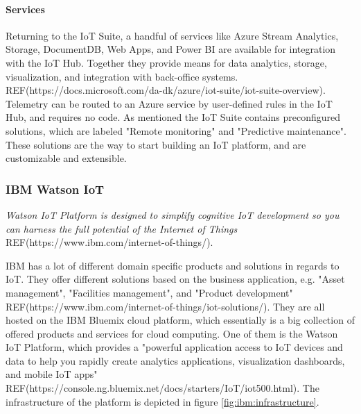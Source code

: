 \paragraph{Services}
Returning to the IoT Suite, a handful of services like Azure Stream Analytics, Storage, DocumentDB, Web Apps, and Power BI are available for integration with the IoT Hub. Together they provide means for data analytics, storage, visualization, and integration with back-office systems. REF(https://docs.microsoft.com/da-dk/azure/iot-suite/iot-suite-overview). Telemetry can be routed to an Azure service by user-defined rules in the IoT Hub, and requires no code. As mentioned the IoT Suite contains preconfigured solutions, which are labeled "Remote monitoring" and "Predictive maintenance". These solutions are the way to start building an IoT platform, and are customizable and extensible. 

\subsubsection{IBM Watson IoT}
\textit{Watson IoT Platform is designed to simplify cognitive IoT development so you can harness the full potential of the Internet of Things} REF(https://www.ibm.com/internet-of-things/).

IBM has a lot of different domain specific products and solutions in regards to IoT. They offer different solutions based on the business application, e.g. "Asset management", "Facilities management", and "Product development" REF(https://www.ibm.com/internet-of-things/iot-solutions/). They are all hosted on the IBM Bluemix cloud platform, which essentially is a big collection of offered products and services for cloud computing. One of them is the Watson IoT Platform, which provides a "powerful application access to IoT devices and data to help you rapidly create analytics applications, visualization dashboards, and mobile IoT apps" REF(https://console.ng.bluemix.net/docs/starters/IoT/iot500.html). The infrastructure of the platform is depicted in figure \ref{fig:ibm:infrastructure}.

